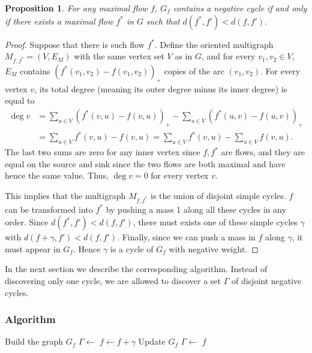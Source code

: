 \documentclass[]{article}
\newtheorem{proposition}{Proposition}
\begin{document}
\begin{proposition}
	For any maximal flow $f$, $G_f$ contains a negative cycle if and only if there exists a maximal flow $f^*$ in $G$ such that $d(f^*, f') < d(f, f')$.
\end{proposition}
\begin{proof}
	Suppose that there is such flow $f^*$. Define the oriented multigraph $M_{f,f^*}=(V,E_M)$ with the same vertex set $V$ as in $G$, and for every $v_1,v_2 \in V$, $E_M$ contains $(f^*(v_1,v_2) - f(v_1,v_2))_+$  copies of the arc $(v_1,v_2)$. For every vertex $v$, its total degree (meaning its outer degree minus its inner degree) is equal to 
	\begin{align*}
		\deg v & = \sum_{u\in V} (f^*(v,u) - f(v,u))_+ - \sum_{u\in V} (f^*(u,v) - f(u,v))_+  \\
		& = \sum_{u\in V} f^*(v,u) - f(v,u) = \sum_{u\in V} f^*(v,u) - \sum_{u\in V}  f(v,u).
	\end{align*}
	The last two sums are zero for any inner vertex since $f,f^*$ are flows, and they are equal on the source and sink since the two flows are both maximal and have hence the same value. Thus, $\deg v = 0$ for every vertex $v$.
	
	This implies that the multigraph $M_{f,f^*}$ is the union of disjoint simple cycles. $f$ can be transformed into $f^*$ by pushing a mass 1 along all these cycles in any order. Since $d(f^*, f')<d(f,f')$, there must exists one of these simple cycles $\gamma$ with $d(f+\gamma, f') < d(f, f')$. Finally, since we can push a mass in $f$ along $\gamma$, it must appear in $G_f$. Hence $\gamma$ is a cycle of $G_f$ with negative weight.
\end{proof}

In the next section we describe the corresponding algorithm. Instead of discovering only one cycle, we are allowed to discover a set $\Gamma$ of disjoint negative cycles. 

\subsubsection*{Algorithm}
\begin{algorithmic}[1]
	\State Build the graph $G_f$
	\State $\Gamma \leftarrow$ 
	\While{$\Gamma \neq \emptyset$}
	\ForAll{$\gamma \in \Gamma$}
	\State $f \leftarrow f+\gamma$
	\EndFor
	\State Update $G_f$
	\State $\Gamma \leftarrow$ 
	\EndWhile
	\State \Return $f$
	\EndFunction
\end{algorithmic}
\end{document}
